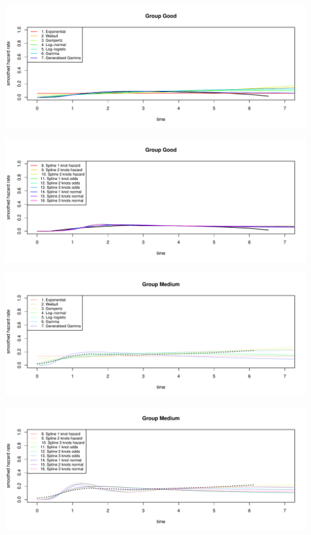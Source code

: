 \documentclass[]{article}
\begin{document}
\begin{flushleft}\includegraphics[height=0.29\textheight]{Images/plot_haz_pred-1} \end{flushleft}

\begin{flushleft}\includegraphics[height=0.29\textheight]{Images/plot_haz_pred-2} \end{flushleft}

\begin{flushleft}\includegraphics[height=0.29\textheight]{Images/plot_haz_pred-3} \end{flushleft}

\begin{flushleft}\includegraphics[height=0.29\textheight]{Images/plot_haz_pred-4} \end{flushleft}
\end{document}
